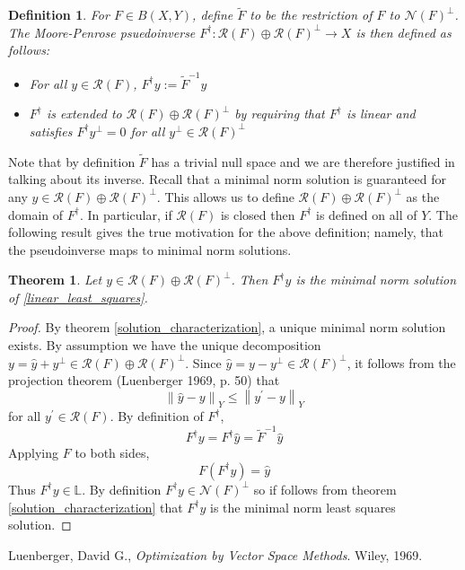 \documentclass[12pt]{article}
\newcommand*{\norm}[1]{\left\lVert#1\right\rVert}
\newcommand{\R}{\mathcal{R}}
\newcommand{\N}{\mathcal{N}}
\newtheorem{definition}{Definition}
\newtheorem{thm}{Theorem}
\begin{document}
 \begin{definition} 
 For $F \in B(X, Y)$, define $\tilde{F}$ to be the restriction of $F$ to $\N(F)^\perp$. The Moore-Penrose psuedoinverse $F^\dagger : \R(F) \oplus \R(F)^\perp \to X$ is then defined as follows: 
 \begin{itemize} 
 \item For all $y \in \R(F)$, $F^\dagger y := \tilde{F}^{-1}y$
 \item $F^\dagger$ is extended to $\R(F) \oplus \R(F)^\perp$ by requiring that $F^\dagger$ is linear and satisfies $F^\dagger y^\perp = 0$ for all $y^\perp \in \R(F)^\perp$
 \end{itemize} 
 \end{definition} 
 
Note that by definition $\tilde{F}$ has a trivial null space and we are therefore justified in talking 
about its inverse. Recall that a minimal norm solution is guaranteed for any $y \in \R(F) \oplus \R(F)^\perp$. 
This allows us to define $\R(F) \oplus \R(F)^\perp$ as the domain of $F^\dagger$. In particular, if $\R(F)$ is closed then $F^\dagger$ 
is defined on all of $Y$. The following result gives the true motivation for the above definition; namely, that the pseudoinverse maps 
to minimal norm solutions.

\begin{thm} 
Let $y \in \R(F) \oplus \R(F)^\perp$. Then $F^\dagger y$ is the minimal norm solution of \eqref{linear_least_squares}. 
\end{thm} 

\begin{proof} 
By theorem \ref{solution_characterization}, a unique minimal norm solution exists. By assumption we have the 
unique decomposition $y = \hat{y} + y^\perp \in \R(F) \oplus \R(F)^\perp$. Since $\hat{y} = y - y^\perp \in \R(F)^\perp$, 
it follows from the projection theorem (Luenberger 1969, p. 50) that \[\norm{\hat{y} - y}_Y \leq \norm{y^\prime - y}_Y\]
for all $y^\prime \in \R(F)$. By definition of $F^\dagger$, 
\[F^\dagger y = F^\dagger \hat{y} = \tilde{F}^{-1}\hat{y}\]
Applying $F$ to both sides, 
\[F(F^\dagger y) = \hat{y}\]
Thus $F^\dagger y \in \mathbb{L}$. By definition $F^\dagger y \in \N(F)^\perp$ so if follows from 
theorem \ref{solution_characterization} that $F^\dagger y$ is the minimal norm least squares solution. 
\end{proof} 

  
\begin{thebibliography}{20}

  Luenberger, David G., \textit{Optimization by Vector Space Methods}. Wiley, 1969. 

\end{thebibliography}
 
\end{document}
